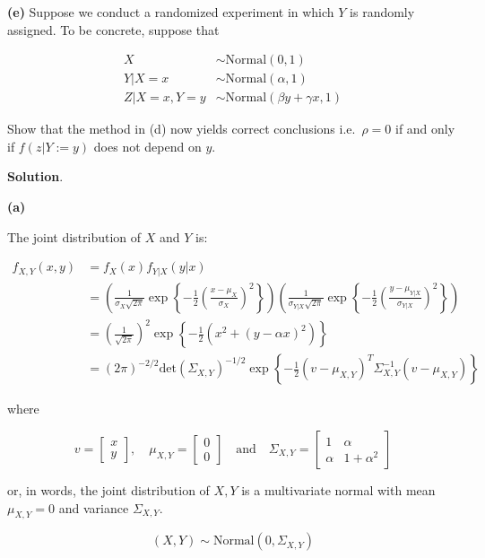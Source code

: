 \textbf{(e)} Suppose we conduct a randomized experiment in which \(Y\)
is randomly assigned. To be concrete, suppose that

\begin{align*}
X &\sim \text{Normal}(0, 1) \\
Y | X = x &\sim \text{Normal}(\alpha, 1) \\
Z | X = x, Y = y &\sim \text{Normal}(\beta y + \gamma x, 1)
\end{align*}

Show that the method in (d) now yields correct conclusions
i.e.~\(\rho = 0\) if and only if \(f(z | Y := y)\) does not depend on
\(y\).

\textbf{Solution}.

\textbf{(a)}

The joint distribution of \(X\) and \(Y\) is:

\begin{align*}
f_{X, Y}(x, y) &= f_X(x) f_{Y | X}(y | x) \\
&= \left(\frac{1}{\sigma_X \sqrt{2\pi}} \exp \left\{-\frac{1}{2} \left(\frac{x - \mu_X}{\sigma_X}\right)^{2} \right\} \right)
\left(\frac{1}{\sigma_{Y | X} \sqrt{2\pi}} \exp \left\{-\frac{1}{2} \left(\frac{y - \mu_{Y | X}}{\sigma_{Y | X}}\right)^{2} \right\}\right) \\
&= \left(\frac{1}{\sqrt{2\pi}}\right)^{2} \exp \left\{ -\frac{1}{2} \left( x^{2} + (y - \alpha x)^{2}\right) \right\} \\
&= (2 \pi)^{-2 / 2} \text{det} (\Sigma_{X, Y})^{-1/2} \exp \left\{ -\frac{1}{2} (v - \mu_{X, Y})^T \Sigma_{X, Y}^{-1} (v - \mu_{X, Y})\right\}
\end{align*}

where

\[
v = \begin{bmatrix}x \\ y\end{bmatrix},
\quad \mu_{X, Y} = \begin{bmatrix}0 \\ 0\end{bmatrix}
\quad \text{and} \quad
\Sigma_{X, Y} = \begin{bmatrix}
1 & \alpha \\
\alpha & 1 + \alpha^{2}
\end{bmatrix}
\]

or, in words, the joint distribution of \(X, Y\) is a multivariate
normal with mean \(\mu_{X, Y} = 0\) and variance \(\Sigma_{X, Y}\).

\[ (X, Y) \sim \text{Normal}( 0, \Sigma_{X, Y}) \]

